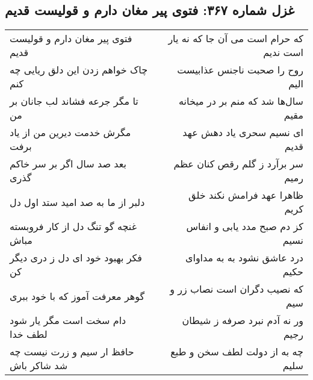 \begin{center}
\section*{غزل شماره ۳۶۷: فتوی پیر مغان دارم و قولیست قدیم}
\label{sec:sh367}
\begin{longtable}{l p{0.5cm} r}
فتوی پیر مغان دارم و قولیست قدیم
&&
که حرام است می آن جا که نه یار است ندیم
\\
چاک خواهم زدن این دلق ریایی چه کنم
&&
روح را صحبت ناجنس عذابیست الیم
\\
تا مگر جرعه فشاند لب جانان بر من
&&
سال‌ها شد که منم بر در میخانه مقیم
\\
مگرش خدمت دیرین من از یاد برفت
&&
ای نسیم سحری یاد دهش عهد قدیم
\\
بعد صد سال اگر بر سر خاکم گذری
&&
سر برآرد ز گلم رقص کنان عظم رمیم
\\
دلبر از ما به صد امید ستد اول دل
&&
ظاهرا عهد فرامش نکند خلق کریم
\\
غنچه گو تنگ دل از کار فروبسته مباش
&&
کز دم صبح مدد یابی و انفاس نسیم
\\
فکر بهبود خود ای دل ز دری دیگر کن
&&
درد عاشق نشود به به مداوای حکیم
\\
گوهر معرفت آموز که با خود ببری
&&
که نصیب دگران است نصاب زر و سیم
\\
دام سخت است مگر یار شود لطف خدا
&&
ور نه آدم نبرد صرفه ز شیطان رجیم
\\
حافظ ار سیم و زرت نیست چه شد شاکر باش
&&
چه به از دولت لطف سخن و طبع سلیم
\\
\end{longtable}
\end{center}
